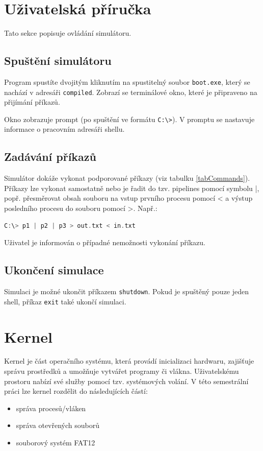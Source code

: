 \documentclass[12pt, a4paper]{article}
\let\oldsection\section
\renewcommand\section{\clearpage\oldsection}
\begin{document}
\section{Uživatelská příručka}
	Tato sekce popisuje ovládání simulátoru.    
    
    \subsection{Spuštění simulátoru}
Program spustíte dvojitým kliknutím na spustitelný soubor \texttt{boot.exe}, který se nachází v adresáři \texttt{compiled}. Zobrazí se terminálové okno, které je připraveno na přijímání příkazů.    

Okno zobrazuje prompt (po spuštění ve formátu \texttt{C:\textbackslash>}). V promptu se nastavuje informace o pracovním adresáři shellu.
    
    \subsection{Zadávání příkazů}
	Simulátor dokáže vykonat podporované příkazy (viz tabulku \ref{tabCommands}). Příkazy lze vykonat samostatně nebo je řadit do tzv. pipelines pomocí symbolu |, popř. přesměrovat obsah souboru na vstup prvního procesu pomocí < a výstup posledního procesu do souboru pomocí >.
	Např.:    
	\begin{lstlisting}[language=C, caption={Příklad pipeline},captionpos=b]
    C:\> p1 | p2 | p3 > out.txt < in.txt
    \end{lstlisting}
    
    Uživatel je informován o případné nemožnosti vykonání příkazu.
    
    
    \subsection{Ukončení simulace}
    Simulaci je možné ukončit příkazem \texttt{shutdown}. Pokud je spuštěný pouze jeden shell, příkaz \texttt{exit} také ukončí simulaci.




    \section{Kernel}

    Kernel je část operačního systému, která provádí inicializaci hardwaru, zajišťuje správu prostředků a umožňuje vytvářet programy či vlákna. Uživatelskému prostoru nabízí své služby pomocí tzv. systémových volání. V této semestrální práci lze kernel rozdělit do následujících částí: 
\begin{itemize}
    \item správa procesů/vláken
    \item správa otevřených souborů
    \item souborový systém FAT12
\end{itemize}
\end{document}
